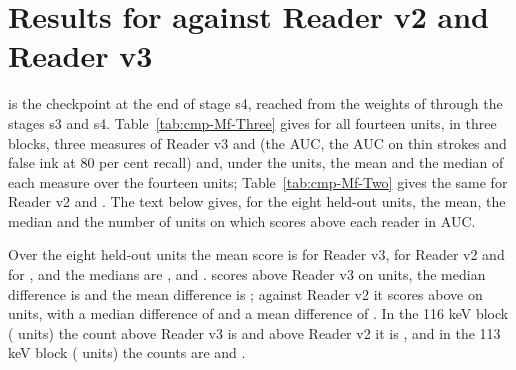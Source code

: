 \section{Results for \MfName{} against Reader v2 and Reader v3}\label{sec:results-Mf}

\MfName{} is the checkpoint at the end of stage s4, reached from the weights of \MtName{} through the stages s3 and s4. Table~\ref{tab:cmp-Mf-Three} gives for all fourteen units, in three blocks, three measures of Reader v3 and \MfName{} (the AUC, the AUC on thin strokes and false ink at 80 per cent recall) and, under the units, the mean and the median of each measure over the fourteen units; Table~\ref{tab:cmp-Mf-Two} gives the same for Reader v2 and \MfName{}. The text below gives, for the eight held-out units, the mean, the median and the number of units on which \MfName{} scores above each reader in AUC.

\begin{table}[!t]
\caption{Three measures of \MfName{} against Reader v3 on the fourteen units: the AUC, the AUC on thin
strokes and false ink at 80 per cent recall. The cell of \MfName{} gives in parentheses the signed difference
against Reader v3. The rows Mean and Median are taken over all fourteen units; the
block of the community labels is information only.}\label{tab:cmp-Mf-Three}
\centering

\par\smallskip
{\footnotesize\raggedright\par}
\end{table}

\begin{table}[!t]
\caption{Three measures of \MfName{} against Reader v2 on the fourteen units, in the format of Table~\ref{tab:cmp-Mf-Three}. The cell of \MfName{} gives in parentheses the signed difference
against Reader v2. The rows Mean and Median are taken over all fourteen units; the
block of the community labels is information only.}\label{tab:cmp-Mf-Two}
\centering

\par\smallskip
{\footnotesize\raggedright\par}
\end{table}

Over the eight held-out units the mean score is \MfHeldMeanRThreeAuc{} for Reader v3, \MfHeldMeanRTwoAuc{} for Reader v2 and \MfHeldMeanOwnAuc{} for \MfName{}, and the medians are \MfHeldMedianRThreeAuc{}, \MfHeldMedianRTwoAuc{} and \MfHeldMedianOwnAuc{}. \MfName{} scores above Reader v3 on \MfHeldKTextThree{} units, the median difference is \MfHeldMedianDiffThreeAuc{} and the mean difference is \MfHeldMeanDiffThreeAuc{}; against Reader v2 it scores above on \MfHeldKTextTwo{} units, with a median difference of \MfHeldMedianDiffTwoAuc{} and a mean difference of \MfHeldMeanDiffTwoAuc{}. In the 116 keV block (\BlockLongN{} units) the count above Reader v3 is \MfBlockLongAboveThree{} and above Reader v2 it is \MfBlockLongAboveTwo{}, and in the 113 keV block (\BlockShortN{} units) the counts are \MfBlockShortAboveThree{} and \MfBlockShortAboveTwo{}.

